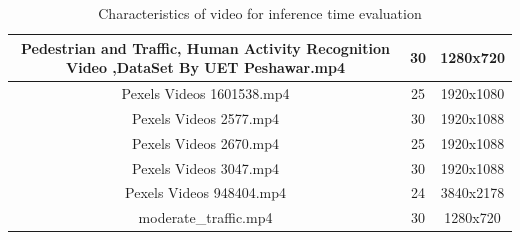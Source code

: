 \documentclass[twoside]{ctuthesis}
\theoremstyle{plain}
\theoremstyle{definition}
\theoremstyle{note}
\begin{document}
\begin{table}[htb]
{\begin{tabular}{|c|c|c|}
Pedestrian and Traffic, Human Activity Recognition Video ,DataSet By UET Peshawar.mp4 & 30                                                                            & 1280x720                                                            \\ \hline
Pexels Videos 1601538.mp4                                                             & 25                                                                            & 1920x1080                                                           \\ \hline
Pexels Videos 2577.mp4                                                                & 30                                                                            & 1920x1088                                                           \\ \hline
Pexels Videos 2670.mp4                                                                & 25                                                                            & 1920x1088                                                           \\ \hline
Pexels Videos 3047.mp4                                                                & 30                                                                            & 1920x1088                                                           \\ \hline
Pexels Videos 948404.mp4                                                              & 24                                                                            & 3840x2178                                                           \\ \hline
moderate\_traffic.mp4                                                                 & 30                                                                            & 1280x720                                                            \\ \hline
\end{tabular}
}
\caption{Characteristics of video for inference time evaluation}
        \label{video_characteristics}
\end{table}
\end{document}
